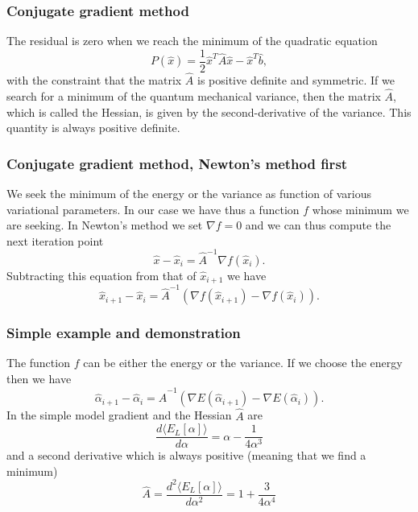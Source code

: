 \documentclass{beamer}
\begin{document}
\begin{frame}
\frametitle{Conjugate gradient method}

\begin{block}{}

The residual is zero when we reach the minimum of the quadratic equation
\begin{equation*}
  P(\hat{x})=\frac{1}{2}\hat{x}^T\hat{A}\hat{x} - \hat{x}^T\hat{b},
\end{equation*}
with the constraint that the matrix $\hat{A}$ is positive definite and symmetric.
If we search for a minimum of the quantum mechanical  variance, then the matrix 
$\hat{A}$, which is called the Hessian, is given by the second-derivative of the variance.  This quantity is always positive definite.
\end{block}
\end{frame}

\begin{frame}
\frametitle{Conjugate gradient method, Newton's method first}

\begin{block}{}
We seek the minimum of the energy or the variance as function of various variational parameters. 
In our case we have thus a function $f$ whose minimum we are seeking.
In Newton's method we set $\nabla f = 0$ and we can thus compute the next iteration point
\begin{equation*}
\hat{x}-\hat{x}_i=\hat{A}^{-1}\nabla f(\hat{x}_i).
\end{equation*}
Subtracting this equation from that of $\hat{x}_{i+1}$ we have
\begin{equation*}
\hat{x}_{i+1}-\hat{x}_i=\hat{A}^{-1}(\nabla f(\hat{x}_{i+1})-\nabla f(\hat{x}_i)).
\end{equation*}
\end{block}
\end{frame}

\begin{frame}
\frametitle{Simple example and demonstration}

\begin{block}{}
The function $f$ can be either the energy or the variance.  If we choose the energy then we have
\begin{equation*}
\hat{\alpha}_{i+1}-\hat{\alpha}_i=\hat{A}^{-1}(\nabla E(\hat{\alpha}_{i+1})-\nabla E(\hat{\alpha}_i)).
\end{equation*}
In the simple model gradient and the Hessian $\hat{A}$ are
\begin{equation*}
\frac{d\langle  E_L[\alpha]\rangle}{d\alpha} = \alpha-\frac{1}{4\alpha^3}
\end{equation*}
and a second derivative which is always positive (meaning that we find a minimum)
\begin{equation*}
\hat{A}= \frac{d^2\langle  E_L[\alpha]\rangle}{d\alpha^2} = 1+\frac{3}{4\alpha^4}
\end{equation*}
\end{block}
\end{frame}
\end{document}
